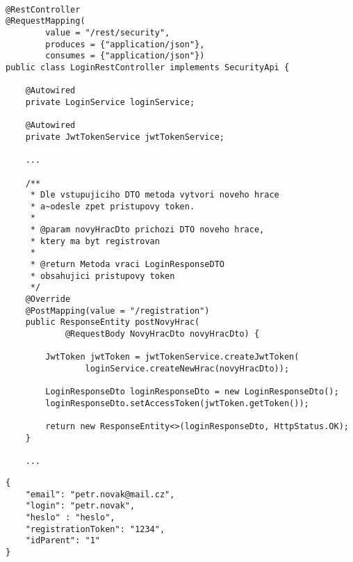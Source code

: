 \documentclass[twoside, 12pt]{article}
\begin{document}
{{\clearpage


\begin{lstlisting}

@RestController
@RequestMapping(
        value = "/rest/security",
        produces = {"application/json"},
        consumes = {"application/json"})
public class LoginRestController implements SecurityApi {

    @Autowired
    private LoginService loginService;

    @Autowired
    private JwtTokenService jwtTokenService;

    ...

    /**
     * Dle vstupujiciho DTO metoda vytvori noveho hrace
     * a~odesle zpet pristupovy token.
     *
     * @param novyHracDto prichozi DTO noveho hrace,
     * ktery ma byt registrovan
     *
     * @return Metoda vraci LoginResponseDTO
     * obsahujici pristupovy token
     */
    @Override
    @PostMapping(value = "/registration")
    public ResponseEntity postNovyHrac(
            @RequestBody NovyHracDto novyHracDto) {

        JwtToken jwtToken = jwtTokenService.createJwtToken(
                loginService.createNewHrac(novyHracDto));

        LoginResponseDto loginResponseDto = new LoginResponseDto();
        loginResponseDto.setAccessToken(jwtToken.getToken());

        return new ResponseEntity<>(loginResponseDto, HttpStatus.OK);
    }

    ...

\end{lstlisting}

\clearpage


\vspace{10}



\vspace{10}


\begin{lstlisting}
{
    "email": "petr.novak@mail.cz",
    "login": "petr.novak",
    "heslo" : "heslo",
    "registrationToken": "1234",
    "idParent": "1"
}
\end{lstlisting}

}}
\end{document}
